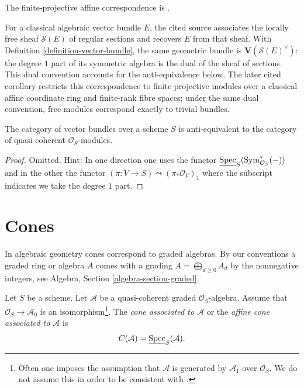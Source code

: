 \begin{lemma}
\label{lemma-category-vector-bundles}
\begin{reference}
\cite[Chapter II, \S 2, no. 41, Proposition 5, p. 233]{FAC}
The finite-projective affine correspondence is
\cite[Chapter II, \S 4, no. 50, Corollary, pp. 242--243]{FAC}.
\end{reference}
\begin{history}
For a classical algebraic vector bundle $E$, the cited source associates the
locally free sheaf $\mathcal{S}(E)$ of regular sections and recovers $E$ from
that sheaf. With Definition \ref{definition-vector-bundle}, the same
geometric bundle is $\mathbf{V}(\mathcal{S}(E)^\vee)$: the degree $1$ part
of its symmetric algebra is the dual of the sheaf of sections. This dual
convention accounts for the anti-equivalence below. The later cited
corollary restricts this correspondence to finite projective modules over a
classical affine coordinate ring and finite-rank fibre spaces; under the same
dual convention, free modules correspond exactly to trivial bundles.
\end{history}
The category of vector bundles over a scheme $S$ is
anti-equivalent to the category of quasi-coherent $\mathcal{O}_S$-modules.
\end{lemma}

\begin{proof}
Omitted. Hint: In one direction one uses the functor
$\underline{\mathop{\mathrm{Spec}}}_S(\text{Sym}^*_{\mathcal{O}_S}(-))$
and in the other the functor
$(\pi : V \to S) \leadsto (\pi_*\mathcal{O}_V)_1$ where the subscript
indicates we take the degree $1$ part.
\end{proof}




\section{Cones}
\label{section-cone}

\noindent
In algebraic geometry cones correspond to graded algebras. By our conventions
a graded ring or algebra $A$ comes with a grading
$A = \bigoplus_{d \geq 0} A_d$ by the nonnegative integers, see
Algebra, Section \ref{algebra-section-graded}.

\begin{definition}
\label{definition-cone}
Let $S$ be a scheme. Let $\mathcal{A}$ be a quasi-coherent
graded $\mathcal{O}_S$-algebra. Assume that $\mathcal{O}_S \to \mathcal{A}_0$
is an isomorphism\footnote{Often one imposes the assumption that
$\mathcal{A}$ is generated by $\mathcal{A}_1$ over $\mathcal{O}_S$. We do not
assume this in order to be consistent with \cite[II, (8.3.1)]{EGA}.}.
The {\it cone associated to $\mathcal{A}$} or the
{\it affine cone associated to $\mathcal{A}$}
is
$$
C(\mathcal{A}) = \underline{\mathop{\mathrm{Spec}}}_S(\mathcal{A}).
$$
\end{definition}

